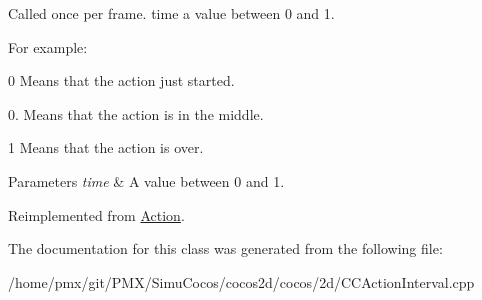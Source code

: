 Called once per frame. time a value between 0 and 1.

For example\+:
\begin{DoxyItemize}
\item 0 Means that the action just started.
\item 0. Means that the action is in the middle.
\item 1 Means that the action is over.
\end{DoxyItemize}


\begin{DoxyParams}{Parameters}
{\em time} & A value between 0 and 1. \\
\hline
\end{DoxyParams}


Reimplemented from \hyperlink{classAction_a937e646e63915e33ad05ba149bfcf239}{Action}.



The documentation for this class was generated from the following file\+:\begin{DoxyCompactItemize}
\item 
/home/pmx/git/\+P\+M\+X/\+Simu\+Cocos/cocos2d/cocos/2d/C\+C\+Action\+Interval.\+cpp\end{DoxyCompactItemize}
